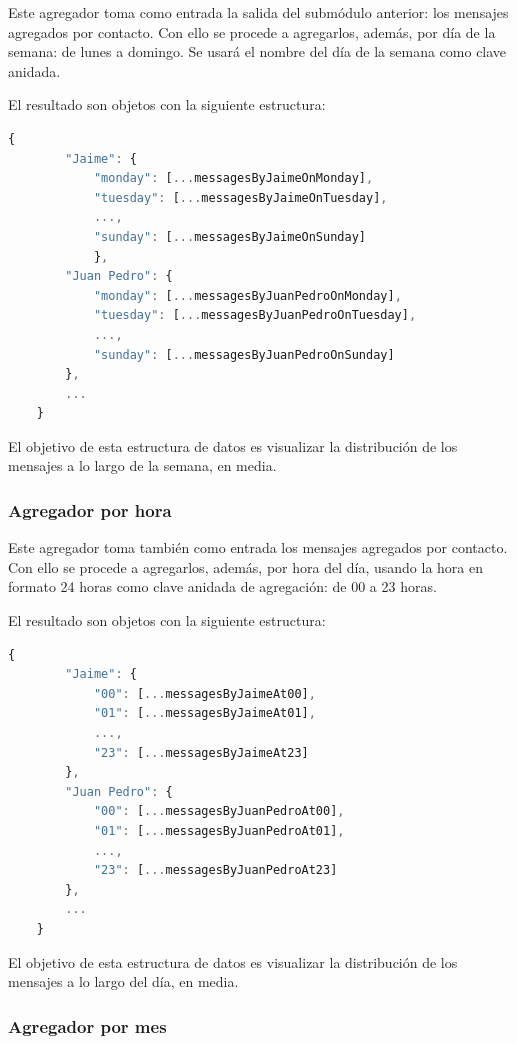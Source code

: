 Este agregador toma como entrada la salida del submódulo anterior: los mensajes agregados por contacto. Con ello se procede a agregarlos, además, por día de la semana: de lunes a domingo. Se usará el nombre del día de la semana como clave anidada.

El resultado son objetos con la siguiente estructura:

\begin{lstlisting}[language=JavaScript]
	{
		"Jaime": {
			"monday": [...messagesByJaimeOnMonday],
			"tuesday": [...messagesByJaimeOnTuesday],
			...,
			"sunday": [...messagesByJaimeOnSunday]
			},
		"Juan Pedro": {
			"monday": [...messagesByJuanPedroOnMonday],
			"tuesday": [...messagesByJuanPedroOnTuesday],
			...,
			"sunday": [...messagesByJuanPedroOnSunday]
		},
		...
	}
\end{lstlisting}

El objetivo de esta estructura de datos es visualizar la distribución de los mensajes a lo largo de la semana, en media.

\subsubsection{Agregador por hora}

Este agregador toma también como entrada los mensajes agregados por contacto. Con ello se procede a agregarlos, además, por hora del día, usando la hora en formato 24 horas como clave anidada de agregación: de 00 a 23 horas.

El resultado son objetos con la siguiente estructura:

\begin{lstlisting}[language=JavaScript]
	{
		"Jaime": {
			"00": [...messagesByJaimeAt00],
			"01": [...messagesByJaimeAt01],
			...,
			"23": [...messagesByJaimeAt23]
		},
		"Juan Pedro": {
			"00": [...messagesByJuanPedroAt00],
			"01": [...messagesByJuanPedroAt01],
			...,
			"23": [...messagesByJuanPedroAt23]
		},
		...
	}
\end{lstlisting}

El objetivo de esta estructura de datos es visualizar la distribución de los mensajes a lo largo del día, en media.

\subsubsection{Agregador por mes}

